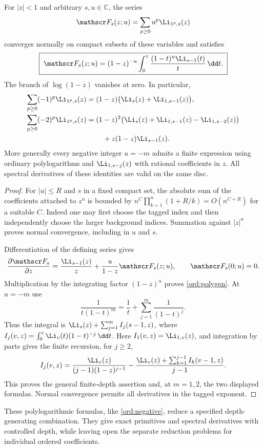 \begin{proposition}
\label{ord:polylog}
For $|z|<1$ and arbitrary $s,u\in\mathbb C$, the series
\[
                  \mathscr F_s(z;u)
                    =\sum_{p\ge0}u^p\Li_{1^p,s}(z)
\]
converges normally on compact subsets of these variables and satisfies
\begin{equation}\label{ord:polygen}
 \boxed{\;
 \mathscr F_s(z;u)
   =(1-z)^{-u}
           \int_0^z\frac{(1-t)^u\Li_{s-1}(t)}{t}\,\dd t.
 \;}
\end{equation}
The branch of $\log(1-z)$ vanishes at zero.  In particular,
\begin{align}
 \sum_{p\ge0}(-1)^p\Li_{1^p,s}(z)
   &=(1-z)\bigl(\Li_s(z)+\Li_{1,s-1}(z)\bigr),
       \label{ord:polyone}\\
 \sum_{p\ge0}(-2)^p\Li_{1^p,s}(z)
   &=(1-z)^2\bigl(\Li_s(z)+\Li_{1,s-1}(z)
                                  -\Li_{1,s-2}(z)\bigr)\notag\\
   &\hspace{8mm}+z(1-z)\Li_{s-1}(z).
       \label{ord:polytwo}
\end{align}
More generally every negative integer $u=-m$ admits a finite expression
using ordinary polylogarithms and $\Li_{1,s-j}(z)$ with rational
coefficients in $z$.  All spectral derivatives of these identities
are valid on the same disc.
\end{proposition}

\begin{proof}
For $|u|\le R$ and $s$ in a fixed compact set, the absolute sum of the
coefficients attached to $z^n$ is bounded by
$n^C\prod_{k=1}^n(1+R/k)=O(n^{C+R})$ for a suitable $C$.
Indeed one may first choose the tagged index and then independently
choose the larger background indices.  Summation against $|z|^n$
proves normal convergence, including in $u$ and $s$.

Differentiation of the defining series gives
\[
 \frac{\partial\mathscr F_s}{\partial z}
    =\frac{\Li_{s-1}(z)}z+\frac{u}{1-z}\mathscr F_s(z;u),
 \qquad \mathscr F_s(0;u)=0.
\]
Multiplication by the integrating factor $(1-z)^u$ proves
\eqref{ord:polygen}.  At $u=-m$ use
\[
 \frac1{t(1-t)^m}=\frac1t+\sum_{j=1}^m\frac1{(1-t)^j}.
\]
Thus the integral is $\Li_s(z)+\sum_{j=1}^m I_j(s-1,z)$, where
$I_j(v,z)=\int_0^z\Li_v(t)(1-t)^{-j}\,\dd t$.
Here $I_1(v,z)=\Li_{1,v}(z)$, and integration by parts gives the finite
recursion, for $j\ge2$,
\[
 I_j(v,z)=\frac{\Li_v(z)}{(j-1)(1-z)^{j-1}}
       -\frac{\Li_v(z)+\sum_{k=1}^{j-1}I_k(v-1,z)}{j-1}.
\]
This proves the general finite-depth assertion and, at $m=1,2$,
the two displayed formulas.  Normal convergence permits all derivatives
in the tagged exponent.
\end{proof}

These polylogarithmic formulas, like \eqref{ord:negative}, reduce a
specified depth-generating combination.  They give exact primitives
and spectral derivatives with controlled depth, while leaving open
the separate reduction problems for individual ordered coefficients.
